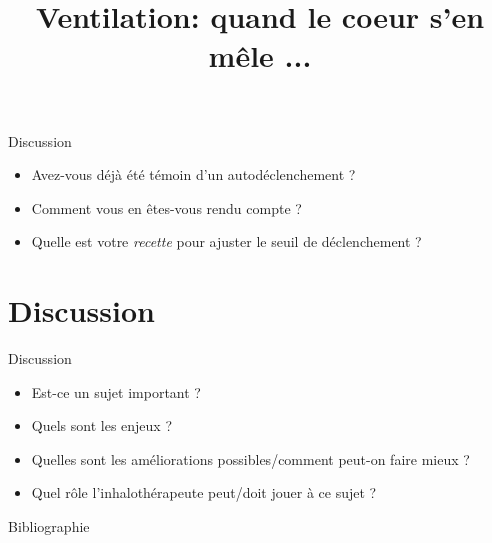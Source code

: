 \documentclass[
aspectratio=169,
bigger,
xcolor=table,
]{beamer}
\title{Ventilation: quand le coeur s'en mêle ...\emoji{beating-heart}}
\author{\ninh}
\institute{\qhum}
\begin{document}

\begin{frame}{Discussion}
	\begin{itemize}
		\item Avez-vous déjà été témoin d'un autodéclenchement ?
		\item Comment vous en êtes-vous rendu compte ?
		\item Quelle est votre \emph{recette} pour ajuster le seuil de
			déclenchement ?
	\end{itemize}
\end{frame}



\section{Discussion}
\begin{frame}{Discussion}
	\begin{itemize}
		\item Est-ce un sujet important ?
		\item Quels sont les enjeux ?
		\item Quelles sont les améliorations possibles/comment peut-on
			faire mieux ?
		\item Quel rôle l'inhalothérapeute peut/doit jouer à ce sujet ?
	\end{itemize}
\end{frame}

\nocite{*}

\begin{frame}[allowframebreaks]{Bibliographie}
	\printbibliography[]{}
\end{frame}

\typeout{}
\typeout{***************}
\typeout{***************}
\typeout{}
%
\end{document}
